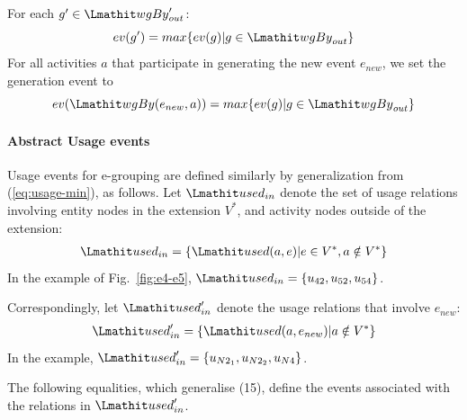 \vspace*{10pt}
\begin{definition}
\label{def:abstract-gen-e}


For each $g' \in \wgby'_{out}$:
\[
ev(g') = max \{ ev(g) | g \in \wgby_{out} \}  
\]
For all activities $a$ that participate in generating the new event $e_{new}$, we set the generation event to
\[
ev(\wgby(e_{new},a)) = max \{ ev(g) | g \in \wgby_{out} \}
\]
\end{definition}


\paragraph*{\textbf{Abstract Usage events}}
Usage events for e-grouping are defined similarly by generalization from (\ref{eq:usage-min}), as follows.
%
Let $\used_{in}$ denote the set of usage relations involving entity nodes in the extension
$V^*$, and activity nodes outside of the extension:
\begin{align*} 
\used_{in} = \{ \used(a,e) |  e \in V^*,  a \notin V^* \}
\end{align*} 
In the example of Fig.~\ref{fig:e4-e5}, $\used_{in} = \{ u_{42}, u_{52}, u_{54} \}$.

%
Correspondingly, let 
$\used'_{in}$ denote the usage relations that involve $e_{new}$:
\begin{align*} 
\used'_{in} = \{ \used(a, e_{new}) | a \notin V^* \}
\end{align*} 
In the example, $\used'_{in} = \{ u_{N2_1}, u_{N2_2}, u_{N4}  \}$.

The following equalities, which generalise (15), define the events associated with the relations in $\used'_{in}$.

